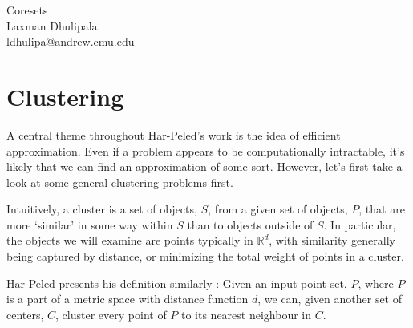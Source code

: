 \documentclass[11pt]{article}
\makeatletter
\newcommand{\myname}{Laxman Dhulipala}
\newcommand{\myandrew}{ldhulipa@andrew.cmu.edu}
\makeatother
\begin{document}
\medskip                        %

\thispagestyle{plain}
\begin{center}                  %
{\Large Coresets} \\
\myname \\
\myandrew
\end{center}

\newcommand{\betaskel}[0]{$\beta$-skeleton}

\section{Clustering}

A central theme throughout Har-Peled's work is the idea of efficient approximation. Even if a problem appears
to be computationally intractable, it's likely that we can find an approximation of some sort. However, let's 
first take a look at some general clustering problems first. 

Intuitively, a cluster is a set of objects, $S$, from a given set of objects, $P$, that are more `similar' 
in some way within $S$ than to objects outside of $S$. In particular, the objects we will examine are points
typically in $\mathbb{R}^{d}$, with similarity generally being captured by distance, or minimizing the total 
weight of points in a cluster. 

Har-Peled presents his definition similarly : Given an input point set, $P$, where $P$ is a part of a metric
space with distance function $d$, we can, given another set of centers, $C$, cluster every point of $P$
to its nearest neighbour in $C$. 
\end{document}
